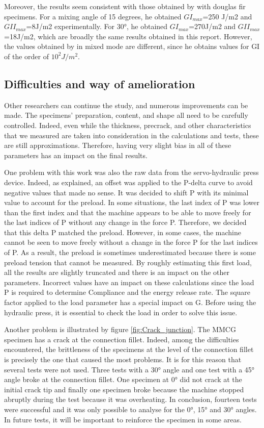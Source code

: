 Moreover, the results seem consistent with those obtained by \cite{MoutouPitti2008} with douglas fir specimens. For a mixing angle of 15 degrees, he obtained $GI_{max}$=250 J/m2 and $GII_{max}$=8J/m2 experimentally. For 30°, he obtained $GI_{max}$=270J/m2 and $GII_{max}$=18J/m2, which are broadly the same results obtained in this report.
However, the values obtained by \cite{Odounga2018phd} in mixed mode are different, since he obtains values for GI of the order of $10^2 J/m^2$.

\subsection{Difficulties and way of amelioration}

Other researchers can continue the study, and numerous improvements can be made. The specimens' preparation, content, and shape all need to be carefully controlled. Indeed, even while the thickness, precrack, and other characteristics that we measured are taken into consideration in the calculations and tests, these are still approximations. Therefore, having very slight bias in all of these parameters has an impact on the final results.

One problem with this work was also the raw data from the servo-hydraulic press device. Indeed, as explained, an offset was applied to the P-delta curve to avoid negative values that made no sense. It was decided to shift P with its minimal value to account for the preload. In some situations, the last index of P was lower than the first index and that the machine appears to be able to move freely for the last indices of P without any change in the force P. Therefore, we decided that this delta P matched the preload. However, in some cases, the machine cannot be seen to move freely without a change in the force P for the last indices of P. As a result, the preload is sometimes underestimated because there is some preload tension that cannot be measured.
By roughly estimating this first load, all the results are slightly truncated and there is an impact on the other parameters. Incorrect values have an impact on these calculations since the load P is required to determine Compliance and the energy release rate. The square factor applied to the load parameter has a special impact on G. Before using the hydraulic press, it is essential to check the load in order to solve this issue. 

Another problem is illustrated by figure \ref{fig:Crack_junction}. The MMCG specimen has a crack at the connection fillet. Indeed, among the difficulties encountered, the brittleness of the specimens at the level of the connection fillet is precisely the one that caused the most problems. It is for this reason that several tests were not used. Three tests with a 30° angle and one test with a 45° angle broke at the connection fillet. One specimen at 0° did not crack at the initial crack tip and finally one specimen broke because the machine stopped abruptly during the test because it was overheating. In conclusion, fourteen tests were successful and it was only possible to analyse for the 0°, 15° and 30° angles. In future tests, it will be important to reinforce the specimen in some areas.

